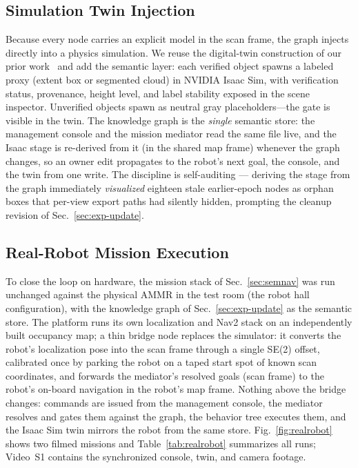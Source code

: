 \subsection{Simulation Twin Injection}
\label{sec:twin}
Because every node carries an explicit model in the scan frame, the graph
injects directly into a physics simulation. We reuse the digital-twin
construction of our prior work~\cite{raaicon2026} and add the semantic layer:
each verified object spawns a labeled proxy (extent box or segmented cloud)
in NVIDIA Isaac Sim, with verification status, provenance, height level,
and label stability exposed in the scene inspector. Unverified objects
spawn as neutral gray placeholders---the gate is visible in the twin.
The knowledge graph is the \emph{single} semantic store: the management
console and the mission mediator read the same file live, and the Isaac
stage is re-derived from it (in the shared map frame) whenever the graph
changes, so an owner edit propagates to the robot's next goal, the
console, and the twin from one write. The discipline is
self-auditing --- deriving the stage from the graph immediately
\emph{visualized} eighteen stale earlier-epoch nodes as orphan boxes that
per-view export paths had silently hidden, prompting the cleanup revision
of Sec.~\ref{sec:exp-update}.

\subsection{Real-Robot Mission Execution}
\label{sec:realrobot}
To close the loop on hardware, the mission stack of Sec.~\ref{sec:semnav}
was run unchanged against the physical AMMR in the test room (the robot
hall configuration), with the knowledge graph of
Sec.~\ref{sec:exp-update} as the semantic store. The platform runs its own
localization and Nav2 stack on an independently built occupancy map; a
thin bridge node replaces the simulator: it converts the robot's
localization pose into the scan frame through a single SE(2) offset,
calibrated once by parking the robot on a taped start spot of known scan
coordinates, and forwards the mediator's resolved goals (scan frame) to
the robot's on-board navigation in the robot's map frame. Nothing above
the bridge changes: commands are issued from the management console, the
mediator resolves and gates them against the graph, the behavior tree
executes them, and the Isaac Sim twin mirrors the robot from the same
store. Fig.~\ref{fig:realrobot} shows two filmed missions and
Table~\ref{tab:realrobot} summarizes all runs; Video~S1 contains the
synchronized console, twin, and camera footage.

